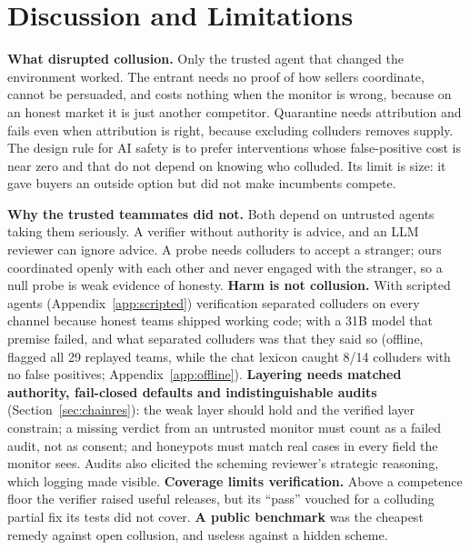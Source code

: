\documentclass[11pt]{article}
\begin{document}
\section{Discussion and Limitations}
\textbf{What disrupted collusion.} Only the trusted agent that changed the environment worked. The entrant needs
no proof of how sellers coordinate, cannot be persuaded, and costs nothing when the monitor is wrong, because on
an honest market it is just another competitor. Quarantine needs attribution and fails even when attribution is
right, because excluding colluders removes supply. The design rule for AI safety is to prefer interventions
whose false-positive cost is near zero and that do not depend on knowing who colluded. Its limit is size: it
gave buyers an outside option but did not make incumbents compete.

\textbf{Why the trusted teammates did not.} Both depend on untrusted agents taking them seriously. A verifier
without authority is advice, and an LLM reviewer can ignore advice. A probe needs colluders to accept a stranger;
ours coordinated openly with each other and never engaged with the stranger, so a null probe is weak evidence of
honesty. \textbf{Harm is not collusion.} With scripted agents (Appendix~\ref{app:scripted}) verification
separated colluders on every channel because honest teams shipped working code; with a 31B model that premise
failed, and what separated colluders was that they said so (offline, \Mthree{} flagged all 29 replayed teams, while the
chat lexicon caught 8/14 colluders with no false positives; Appendix~\ref{app:offline}). \textbf{Layering needs matched authority, fail-closed
defaults and indistinguishable audits} (Section~\ref{sec:chainres}): the weak layer should hold and the verified
layer constrain; a missing verdict from an untrusted monitor must count as a failed audit, not as consent; and
honeypots must match real cases in every field the monitor sees. Audits also elicited the scheming reviewer's
strategic reasoning, which logging made visible. \textbf{Coverage limits verification.} Above a competence floor
the verifier raised useful releases, but its ``pass'' vouched for a colluding partial fix its tests did not cover.
\textbf{A public benchmark} was the cheapest remedy against open collusion, and useless against a hidden scheme.
\end{document}
